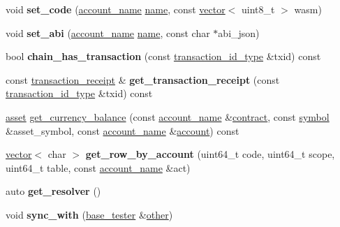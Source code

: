 \begin{DoxyCompactItemize}
void {\bfseries set\+\_\+code} (\mbox{\hyperlink{structaacio_1_1chain_1_1name}{account\+\_\+name}} \mbox{\hyperlink{structaacio_1_1chain_1_1name}{name}}, const \mbox{\hyperlink{classstd_1_1vector}{vector}}$<$ uint8\+\_\+t $>$ wasm)
\item 
\mbox{\label{classaacio_1_1testing_1_1base__tester_af8d950fcd911687671f11161edcd434d}} 
void {\bfseries set\+\_\+abi} (\mbox{\hyperlink{structaacio_1_1chain_1_1name}{account\+\_\+name}} \mbox{\hyperlink{structaacio_1_1chain_1_1name}{name}}, const char $\ast$abi\+\_\+json)
\item 
\mbox{\label{classaacio_1_1testing_1_1base__tester_a8a5475f325052df37ab253995597b1c8}} 
bool {\bfseries chain\+\_\+has\+\_\+transaction} (const \mbox{\hyperlink{classfc_1_1sha256}{transaction\+\_\+id\+\_\+type}} \&txid) const
\item 
\mbox{\label{classaacio_1_1testing_1_1base__tester_a85bcd6347fffa4a88527fe99e53261ae}} 
const \mbox{\hyperlink{structaacio_1_1chain_1_1transaction__receipt}{transaction\+\_\+receipt}} \& {\bfseries get\+\_\+transaction\+\_\+receipt} (const \mbox{\hyperlink{classfc_1_1sha256}{transaction\+\_\+id\+\_\+type}} \&txid) const
\item 
\mbox{\hyperlink{structaacio_1_1asset}{asset}} \mbox{\hyperlink{classaacio_1_1testing_1_1base__tester_a770b193268f4759839daef090e81fb02}{get\+\_\+currency\+\_\+balance}} (const \mbox{\hyperlink{structaacio_1_1chain_1_1name}{account\+\_\+name}} \&\mbox{\hyperlink{structaacio_1_1contract}{contract}}, const \mbox{\hyperlink{classaacio_1_1chain_1_1symbol}{symbol}} \&asset\+\_\+symbol, const \mbox{\hyperlink{structaacio_1_1chain_1_1name}{account\+\_\+name}} \&\mbox{\hyperlink{structaccount}{account}}) const
\item 
\mbox{\label{classaacio_1_1testing_1_1base__tester_a3ab423f987435cb04bf59a841d9718d6}} 
\mbox{\hyperlink{classstd_1_1vector}{vector}}$<$ char $>$ {\bfseries get\+\_\+row\+\_\+by\+\_\+account} (uint64\+\_\+t code, uint64\+\_\+t scope, uint64\+\_\+t table, const \mbox{\hyperlink{structaacio_1_1chain_1_1name}{account\+\_\+name}} \&act)
\item 
\mbox{\label{classaacio_1_1testing_1_1base__tester_ac36474d87fa7015d2645f55ee8cd43f0}} 
auto {\bfseries get\+\_\+resolver} ()
\item 
\mbox{\label{classaacio_1_1testing_1_1base__tester_ac0319f7de0ebeddd8e038f77a1980f4d}} 
void {\bfseries sync\+\_\+with} (\mbox{\hyperlink{classaacio_1_1testing_1_1base__tester}{base\+\_\+tester}} \&\mbox{\hyperlink{structother}{other}})
\end{DoxyCompactItemize}
